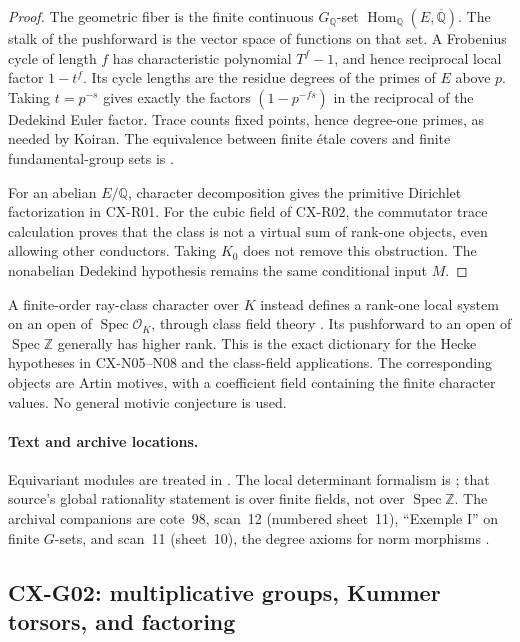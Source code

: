 \documentclass[11pt,a4paper]{article}
\begin{document}
\begin{proof}
The geometric fiber is the finite continuous $G_{\mathbb Q}$-set
$\operatorname{Hom}_{\mathbb Q}(E,\overline{\mathbb Q})$.
The stalk of the pushforward is the vector space of functions on that set.
A Frobenius cycle of length $f$ has characteristic polynomial $T^f-1$,
and hence reciprocal local factor $1-t^f$.  Its cycle lengths are the
residue degrees of the primes of $E$ above $p$.  Taking $t=p^{-s}$ gives
exactly the factors $(1-p^{-fs})$ in the reciprocal of the Dedekind Euler
factor.  Trace counts fixed points, hence degree-one primes, as needed by
Koiran.  The equivalence between finite étale covers and finite
fundamental-group sets is \cite[Exp.~V, \S4 Theorem~1, and \S7]{SGA1}.

For an abelian $E/\mathbb Q$, character decomposition gives the primitive
Dirichlet factorization in CX-R01.  For the cubic field of CX-R02, the
commutator trace calculation proves that the class is not a virtual sum of
rank-one objects, even allowing other conductors.  Taking $K_0$ does not
remove this obstruction.  The nonabelian Dedekind hypothesis remains the
same conditional input $M$.
\end{proof}

A finite-order ray-class character over $K$ instead defines a rank-one
local system on an open of $\operatorname{Spec}\mathcal O_K$, through
class field theory \cite[Introduction, Theorems~0.4--0.5]{MilneCFT}.
Its pushforward to an open of $\operatorname{Spec}\mathbb Z$ generally has
higher rank.  This is the exact dictionary for the Hecke hypotheses in
CX-N05--N08 and the class-field applications.  The corresponding objects
are Artin motives, with a coefficient field containing the finite character
values.  No general motivic conjecture is used.

\paragraph{Text and archive locations.}
Equivariant modules are treated in \cite[Exp.~I 4.7.1--4.7.2]{SGA3}.
The local determinant formalism is
\cite[Exp.~XV, \S3 no.~1, Proposition~1, and no.~2]{SGA5}; that source's
global rationality statement is over finite fields, not over
$\operatorname{Spec}\mathbb Z$.
The archival companions are cote~98, scan~12 (numbered sheet~11),
``Exemple I'' on finite $G$-sets, and scan~11 (sheet~10), the degree axioms
for norm morphisms \cite{Archive98}.

\subsection{CX-G02: multiplicative groups, Kummer torsors, and factoring}
\label{finding:CX-G02}
\end{document}
